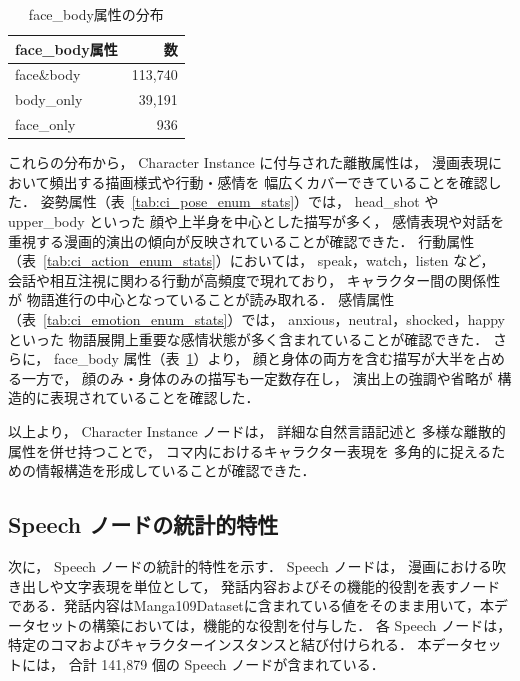 \documentclass[a4j,12pt,dvipdfmx]{jsreport}
\begin{document}
\begin{table}[htbp]
   \hfill
   \begin{minipage}[t]{0.48\linewidth}
      \centering
      \caption{face\_body属性の分布}
      \label{tab:ci_face_body_enum_stats}
      \begin{tabular}{lr}
         \toprule
         face\_body属性 & 数         \\
         \midrule
         face\&body   & 113{,}740 \\
         body\_only   & 39{,}191  \\
         face\_only   & 936       \\
         \bottomrule
      \end{tabular}
   \end{minipage}
\end{table}

これらの分布から，
Character Instance に付与された離散属性は，
漫画表現において頻出する描画様式や行動・感情を
幅広くカバーできていることを確認した．
姿勢属性（表~\ref{tab:ci_pose_enum_stats}）では，
head\_shot や upper\_body といった
顔や上半身を中心とした描写が多く，
感情表現や対話を重視する漫画的演出の傾向が反映されていることが確認できた．
行動属性（表~\ref{tab:ci_action_enum_stats}）においては，
speak，watch，listen など，
会話や相互注視に関わる行動が高頻度で現れており，
キャラクター間の関係性が
物語進行の中心となっていることが読み取れる．
感情属性（表~\ref{tab:ci_emotion_enum_stats}）では，
anxious，neutral，shocked，happy といった
物語展開上重要な感情状態が多く含まれていることが確認できた．
さらに，
face\_body 属性（表~\ref{tab:ci_face_body_enum_stats}）より，
顔と身体の両方を含む描写が大半を占める一方で，
顔のみ・身体のみの描写も一定数存在し，
演出上の強調や省略が
構造的に表現されていることを確認した．

以上より，
Character Instance ノードは，
詳細な自然言語記述と
多様な離散的属性を併せ持つことで，
コマ内におけるキャラクター表現を
多角的に捉えるための情報構造を形成していることが確認できた．

\subsection{Speech ノードの統計的特性}
\label{sec:speech_node_stats}
次に，
Speech ノードの統計的特性を示す．
Speech ノードは，
漫画における吹き出しや文字表現を単位として，
発話内容およびその機能的役割を表すノードである．発話内容はManga109Datasetに含まれている値をそのまま用いて，本データセットの構築においては，機能的な役割を付与した．
各 Speech ノードは，
特定のコマおよびキャラクターインスタンスと結び付けられる．
本データセットには，
合計 141{,}879 個の Speech ノードが含まれている．
\end{document}
